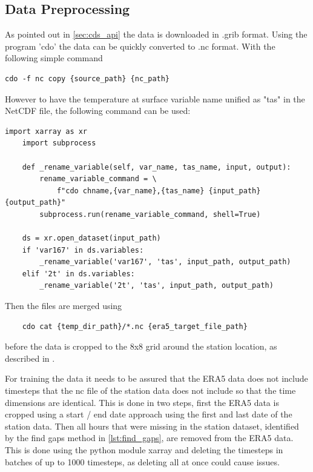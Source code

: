 \subsection{Data Preprocessing}

As pointed out in \autoref{sec:cds_api} the data is downloaded in .grib format. Using the program 'cdo' the data can be quickly converted to .nc format. With the following simple command

\begin{lstlisting}
cdo -f nc copy {source_path} {nc_path}
\end{lstlisting}

However to have the temperature at surface variable name unified as "tas" in the NetCDF file, the following command can be used:

\begin{lstlisting}[caption=Renaming Variable in NetCDF File, label=lst:rename_variable]
    import xarray as xr
    import subprocess

    def _rename_variable(self, var_name, tas_name, input, output):
        rename_variable_command = \
            f"cdo chname,{var_name},{tas_name} {input_path} {output_path}"
        subprocess.run(rename_variable_command, shell=True)
        
    ds = xr.open_dataset(input_path)
    if 'var167' in ds.variables:
        _rename_variable('var167', 'tas', input_path, output_path)
    elif '2t' in ds.variables:
        _rename_variable('2t', 'tas', input_path, output_path)

\end{lstlisting}

Then the files are merged using 

\begin{lstlisting}
    cdo cat {temp_dir_path}/*.nc {era5_target_file_path}
\end{lstlisting}

before the data is cropped to the 8x8 grid around the station location, as described in .

For training the data it needs to be assured that the ERA5 data does not include timesteps that the nc file of the station data does not include so that the time dimensions are identical. This is done in two steps, first the ERA5 data is cropped using a start / end date approach using the first and last date of the station data. Then all hours that were missing in the station dataset, identified by the find gaps method in \autoref{lst:find_gaps}, are removed from the ERA5 data. This is done using the python module xarray and deleting the timesteps in batches of up to 1000 timesteps, as deleting all at once could cause issues.


